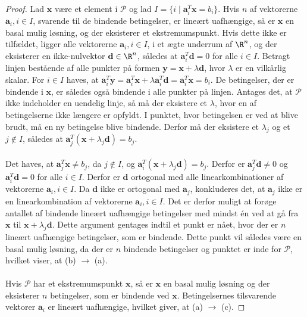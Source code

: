\begin{proof}
Lad $\textbf{x}$ være et element i $\mathcal{P}$ og lad $I = \{ i \mid \textbf{a}_i^T\textbf{x} = b_i \}$.
Hvis $n$ af vektorerne  $\textbf{a}_i, i \in I$, svarende til de bindende betingelser, er lineært uafhængige, så er $\textbf{x}$ en basal mulig løsning, og der eksisterer et ekstremumspunkt.
Hvis dette ikke er tilfældet, ligger alle vektorerne $\textbf{a}_i, i \in I$, i et ægte underrum af $\R^n$, og der eksisterer en ikke-nulvektor $\textbf{d} \in \R^n$, således at $\textbf{a}_i^T\textbf{d} = 0$ for alle $i \in I$.
Betragt linjen bestående af alle punkter på formen $\textbf{y} = \textbf{x} + \lambda \textbf{d}$, hvor $\lambda$ er en vilkårlig skalar.
For $i \in I$ haves, at $\textbf{a}_i^T\textbf{y} = \textbf{a}_i^T\textbf{x} + \lambda \textbf{a}_i^T\textbf{d} = \textbf{a}_i^T\textbf{x} = b_i$.
De betingelser, der er bindende i $\textbf{x}$, er således også bindende i alle punkter på linjen.
Antages det, at $\mathcal{P}$ ikke indeholder en uendelig linje, så må der eksistere et $\lambda$, hvor en af betingelserne ikke længere er opfyldt.
I punktet, hvor betingelsen er ved at blive brudt, må en ny betingelse blive bindende.
Derfor må der eksistere et $\lambda_j$ og et $j \notin I$, således at $\textbf{a}_j^T (\textbf{x} + \lambda_j\textbf{d}) = b_j$.\\\\
%
Det haves, at $\textbf{a}_j^T\textbf{x} \neq b_j$, da $j \notin I$, og $\textbf{a}_i^T (\textbf{x} + \lambda_j\textbf{d}) = b_j$.
Derfor er $\textbf{a}_j^T\textbf{d} \neq 0$ og $\textbf{a}_i^T\textbf{d} = 0$ for alle $i \in I$.
Derfor er $\textbf{d}$ ortogonal med alle linearkombinationer af vektorerne $\textbf{a}_i, i\in I$.
Da $\textbf{d}$ ikke er ortogonal med $\textbf{a}_j$, konkluderes det, at $\textbf{a}_j$ ikke er en linearkombination af vektorerne $\textbf{a}_i, i \in I$.
Det er derfor muligt at forøge antallet af bindende lineært uafhængige betingelser med mindst én ved at gå fra $\textbf{x}$ til $\textbf{x} + \lambda_j\textbf{d}$.
Dette argument gentages indtil et punkt er nået, hvor der er $n$ lineært uafhængige betingelser, som er bindende.
Dette punkt vil således være en basal mulig løsning, da der er $n$ bindende betingelser og punktet er inde for $\mathcal{P}$, hvilket viser, at (b) $\rightarrow$ (a).\\\\
%
Hvis $\mathcal{P}$ har et ekstremumspunkt $\textbf{x}$, så er $\textbf{x}$ en basal mulig løsning og der eksisterer $n$ betingelser, som er bindende ved $\textbf{x}$.
Betingelsernes tilsvarende vektorer $\textbf{a}_i$ er lineært uafhængige, hvilket giver, at (a) $\rightarrow$ (c).

\end{proof}
